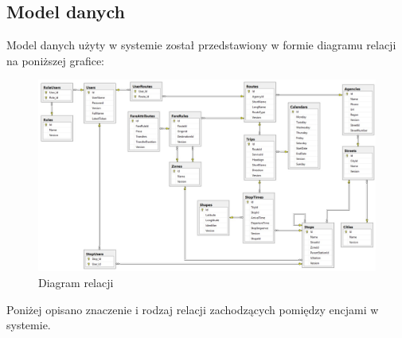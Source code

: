 \documentclass[10pt,a4paper]{article}
\begin{document}
\newpage
\subsection{Model danych}
Model danych użyty w systemie został przedstawiony w formie diagramu relacji na poniższej grafice:
\begin{figure}[H]
	\centering
	\includegraphics[scale = 0.4]{Resources/Images/data-model.jpg}
	\caption{Diagram relacji}
\end{figure}
Poniżej opisano znaczenie i rodzaj relacji zachodzących pomiędzy encjami w systemie.
\end{document}
